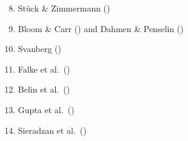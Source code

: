 \documentclass[traditabstract]{aa}
\begin{document}
\begin{minipage}[t]{0.05\linewidth}
\hspace{3mm}
\end{minipage}%
\begin{minipage}[t]{0.43\linewidth}
\begin{enumerate}
\setcounter{enumi}{7}
\item St\"uck \& Zimmermann (\cite{Stueck70})
\item Bloom \& Carr (\cite{Bloom60}) and Dahmen \& Penselin (\cite{Dahmen67})
\item Svanberg (\cite{Svanberg71})
\item Falke et al.\ (\cite{Falke06})
\item Belin et al.\ (\cite{Belin75})
\item Gupta et al.\ (\cite{Gupta73})
\item Sieradzan et al.\ (\cite{Sieradzan97})
\end{enumerate}
\end{minipage}
\end{document}
